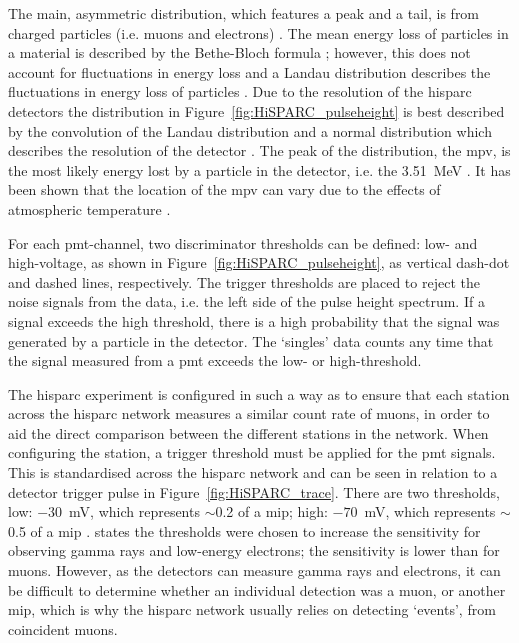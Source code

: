 The main, asymmetric distribution, which features a peak and a tail, is from charged particles (i.e. muons and electrons) \citep{van_dam_hisparc_2020}. The mean energy loss of particles in a material is described by the Bethe-Bloch formula \citep{bethe_bremsformel_1932, ziegler_stopping_1999}; however, this does not account for fluctuations in energy loss and a Landau distribution describes the fluctuations in energy loss of particles \citep{fokkema_hisparc_2012}. Due to the resolution of the \gls{hisparc} detectors the distribution in Figure~\ref{fig:HiSPARC_pulseheight} is best described by the convolution of the Landau distribution and a normal distribution which describes the resolution of the detector \citep{fokkema_hisparc_2012}. The peak of the distribution, the \gls{mpv}, is the most likely energy lost by a particle in the detector, i.e. the 3.51~MeV \citep{van_dam_hisparc_2020}. It has been shown that the location of the \gls{mpv} can vary due to the effects of atmospheric temperature \citep{bartels_hisparc_2012, van_dam_hisparc_2020}.

For each \gls{pmt}-channel, two discriminator thresholds can be defined: low- and high-voltage, as shown in Figure~\ref{fig:HiSPARC_pulseheight}, as vertical dash-dot and dashed lines, respectively.  The trigger thresholds are placed to reject the noise signals from the data, i.e. the left side of the pulse height spectrum. If a signal exceeds the high threshold, there is a high probability that the signal was generated by a particle in the detector. The `singles' data counts any time that the signal measured from a \gls{pmt} exceeds the low- or high-threshold.

The \gls{hisparc} experiment is configured in such a way as to ensure that each station across the \gls{hisparc} network measures a similar count rate of muons, in order to aid the direct comparison between the different stations in the network. When configuring the station, a trigger threshold must be applied for the \gls{pmt} signals. This is standardised across the \gls{hisparc} network and can be seen in relation to a detector trigger pulse in Figure~\ref{fig:HiSPARC_trace}. There are two thresholds, low: $-30$~mV, which represents $\sim$0.2 of a \gls{mip}; high: $-70$~mV, which represents $\sim$0.5 of a \gls{mip} \citep{fokkema_hisparc_2012, van_dam_hisparc_2020}. \citet{van_dam_hisparc_2020} states the thresholds were chosen to increase the sensitivity for observing gamma rays and low-energy electrons; the sensitivity is lower than for muons. However, as the detectors can measure gamma rays and electrons, it can be difficult to determine whether an individual detection was a muon, or another \gls{mip}, which is why the \gls{hisparc} network usually relies on detecting `events', from coincident muons.

